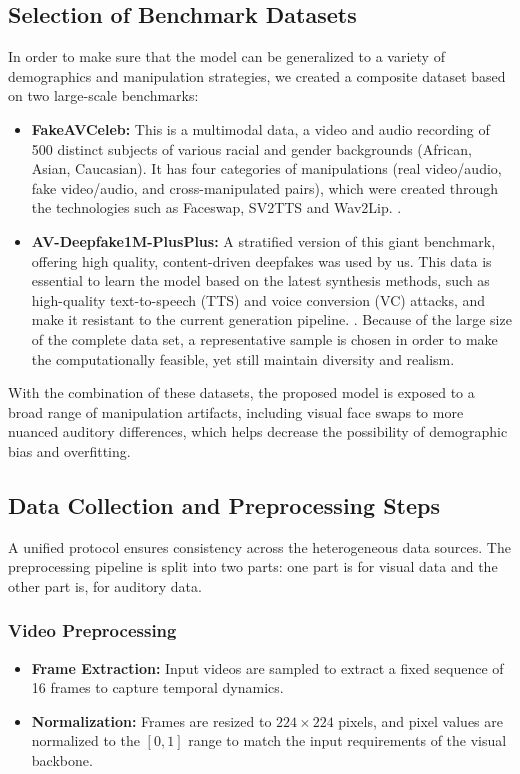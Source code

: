 \documentclass[conference]{IEEEtran}
\begin{document}
\subsection{Selection of Benchmark Datasets}
In order to make sure that the model can be generalized to a variety of demographics and manipulation strategies, we created a composite dataset based on two large-scale benchmarks:
\begin{itemize}
    \item \textbf{FakeAVCeleb:} This is a multimodal data, a video and audio recording of 500 distinct subjects of various racial and gender backgrounds (African, Asian, Caucasian). It has four categories of manipulations (real video/audio, fake video/audio, and cross-manipulated pairs), which were created through the technologies such as Faceswap, SV2TTS and Wav2Lip. \cite{Khalid2022}.
    \item \textbf{AV-Deepfake1M-PlusPlus:} A stratified version of this giant benchmark, offering high quality, content-driven deepfakes was used by us. This data is essential to learn the model based on the latest synthesis methods, such as high-quality text-to-speech (TTS) and voice conversion (VC) attacks, and make it resistant to the current generation pipeline. \cite{Jung2024}. Because of the large size of the complete data set, a representative sample is chosen in order to make the computationally feasible, yet still maintain diversity and realism.
\end{itemize}
With the combination of these datasets, the proposed model is exposed to a broad range of manipulation artifacts, including visual face swaps to more nuanced auditory differences, which helps decrease the possibility of demographic bias and overfitting.

\subsection{Data Collection and Preprocessing Steps}
A unified protocol ensures consistency across the heterogeneous data sources. The preprocessing pipeline is split into two parts: one part is for visual data and the other part is, for auditory data.
\subsubsection{Video Preprocessing}
\begin{itemize}
    \item \textbf{Frame Extraction:} Input videos are sampled to extract a fixed sequence of 16 frames to capture temporal dynamics.
    \item \textbf{Normalization:} Frames are resized to $224 \times 224$ pixels, and pixel values are normalized to the $[0, 1]$ range to match the input requirements of the visual backbone.
\end{itemize}
\end{document}
